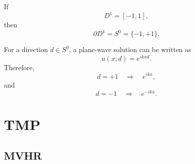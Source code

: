 If
\[
    D^1=[-1,1],
\]
then
\[
    \partial D^1=S^0=\{-1,+1\}.
\]

For a direction $d\in S^0$, a plane-wave solution can be written as
\[
    u(x;d)=e^{ikxd}.
\]
Therefore,
\[
    d=+1 \quad\Longrightarrow\quad e^{ikx},
\]
and
\[
    d=-1 \quad\Longrightarrow\quad e^{-ikx}.
\]





\section{TMP}


\subsection{MVHR}
